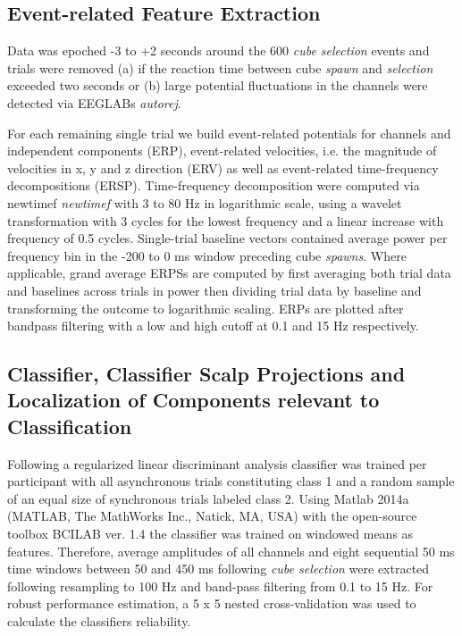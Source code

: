 \subsection{Event-related Feature Extraction}
Data was epoched -3 to +2 seconds around the 600 \textit{cube selection} events and trials were removed (a) if the reaction time between cube \textit{spawn} and \textit{selection} exceeded two seconds or (b) large potential fluctuations in the channels were detected via EEGLABs \textit{autorej}.

For each remaining single trial we build event-related potentials for channels and independent components (ERP), event-related velocities, i.e. the magnitude of velocities in x, y and z direction (ERV) as well as event-related time-frequency decompositions (ERSP). Time-frequency decomposition were computed via newtimef \textit{newtimef} with 3 to 80 Hz in logarithmic scale, using a wavelet transformation with 3 cycles for the lowest frequency and a linear increase with frequency of 0.5 cycles. Single-trial baseline vectors contained average power per frequency bin in the -200 to 0 ms window preceding cube \textit{spawns}. Where applicable, grand average ERPSs are computed by first averaging both trial data and baselines across trials in power then dividing trial data by baseline and transforming the outcome to logarithmic scaling. ERPs are plotted after bandpass filtering with a low and high cutoff at 0.1 and 15 Hz respectively.

\subsection{Classifier, Classifier Scalp Projections and Localization of Components relevant to Classification}
Following \citet{Zander2016} a regularized linear discriminant analysis classifier was trained per participant with all asynchronous trials constituting class 1 and a random sample of an equal size of synchronous trials labeled class 2. Using Matlab 2014a (MATLAB, The MathWorks Inc., Natick, MA, USA) with the open-source toolbox BCILAB ver. 1.4 the classifier was trained on windowed means as features. Therefore, average amplitudes of all channels and eight sequential 50 ms time windows between 50 and 450 ms following \textit{cube selection} were extracted following resampling to 100 Hz and band-pass filtering from 0.1 to 15 Hz. For robust performance estimation, a 5 x 5 nested cross-validation was used to calculate the classifiers reliability.

